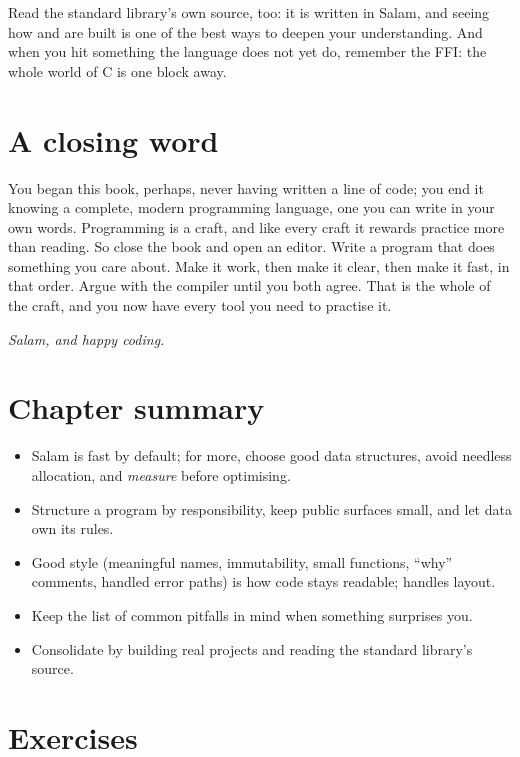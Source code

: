 Read the standard library's own source, too: it is written in Salam, and seeing how
 and  are built is one of the best ways to deepen your
understanding. And when you hit something the language does not yet do, remember
the FFI: the whole world of C is one  block away.

\section{A closing word}

You began this book, perhaps, never having written a line of code; you end it
knowing a complete, modern programming language, one you can write in your own
words. Programming is a craft, and like every craft it rewards practice more than
reading. So close the book and open an editor. Write a program that does something
you care about. Make it work, then make it clear, then make it fast, in that
order. Argue with the compiler until you both agree. That is the whole of the
craft, and you now have every tool you need to practise it.

\bigskip
\noindent\emph{Salam, and happy coding.}

\section{Chapter summary}

\begin{itemize}[leftmargin=1.4em]
  \item Salam is fast by default; for more, choose good data structures, avoid
        needless allocation, and \emph{measure} before optimising.
  \item Structure a program by responsibility, keep public surfaces small, and let
        data own its rules.
  \item Good style (meaningful names, immutability, small functions, ``why''
        comments, handled error paths) is how code stays readable;  handles layout.
  \item Keep the list of common pitfalls in mind when something surprises you.
  \item Consolidate by building real projects and reading the standard library's
        source.
\end{itemize}

\section{Exercises}

